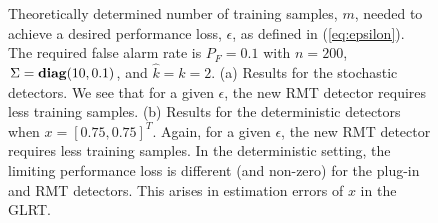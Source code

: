 \begin{figure}
\centering
{}
\vspace{-0.1in}
\caption{Theoretically determined number of training samples, $m$, needed to achieve a desired performance loss, $\epsilon$, as defined in (\ref{eq:epsilon}). The required false alarm rate is $P_F=0.1$ with $n=200$, $\Sigma = \mathop{\bf diag}(10,0.1)$, and $\widehat{k}=k=2$. (a) Results for the stochastic detectors. We see that for a given $\epsilon$, the new RMT detector requires less training samples. (b) Results for the deterministic detectors when $x=[0.75,0.75]^T$. Again, for a given $\epsilon$, the new RMT detector requires less training samples. In the deterministic setting, the limiting performance loss is different (and non-zero) for the plug-in and RMT detectors. This arises in estimation errors of $x$ in the GLRT.}
\label{fig:epsilon_combined}
\end{figure}

